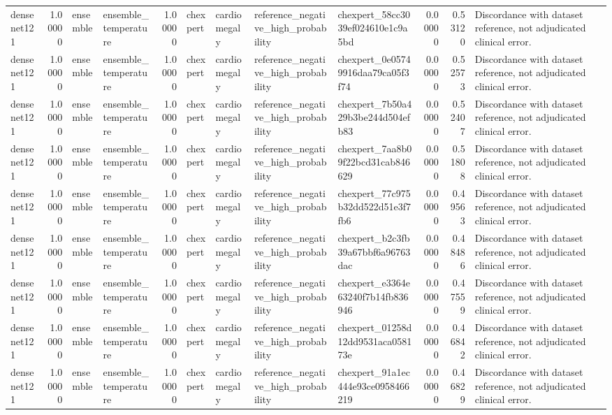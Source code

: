 \begin{tabular}{lrllrllllrrl}
densenet121 & 1.00000 & ensemble & ensemble\_temperature & 1.00000 & chexpert & cardiomegaly & reference\_negative\_high\_probability & chexpert\_58cc3039ef024610e1c9a5bd & 0.00000 & 0.53120 & Discordance with dataset reference, not adjudicated clinical error. \\
densenet121 & 1.00000 & ensemble & ensemble\_temperature & 1.00000 & chexpert & cardiomegaly & reference\_negative\_high\_probability & chexpert\_0e05749916daa79ca05f3f74 & 0.00000 & 0.52573 & Discordance with dataset reference, not adjudicated clinical error. \\
densenet121 & 1.00000 & ensemble & ensemble\_temperature & 1.00000 & chexpert & cardiomegaly & reference\_negative\_high\_probability & chexpert\_7b50a429b3be244d504efb83 & 0.00000 & 0.52407 & Discordance with dataset reference, not adjudicated clinical error. \\
densenet121 & 1.00000 & ensemble & ensemble\_temperature & 1.00000 & chexpert & cardiomegaly & reference\_negative\_high\_probability & chexpert\_7aa8b09f22bcd31cab846629 & 0.00000 & 0.51808 & Discordance with dataset reference, not adjudicated clinical error. \\
densenet121 & 1.00000 & ensemble & ensemble\_temperature & 1.00000 & chexpert & cardiomegaly & reference\_negative\_high\_probability & chexpert\_77c975b32dd522d51e3f7fb6 & 0.00000 & 0.49563 & Discordance with dataset reference, not adjudicated clinical error. \\
densenet121 & 1.00000 & ensemble & ensemble\_temperature & 1.00000 & chexpert & cardiomegaly & reference\_negative\_high\_probability & chexpert\_b2c3fb39a67bbf6a96763dac & 0.00000 & 0.48486 & Discordance with dataset reference, not adjudicated clinical error. \\
densenet121 & 1.00000 & ensemble & ensemble\_temperature & 1.00000 & chexpert & cardiomegaly & reference\_negative\_high\_probability & chexpert\_e3364e63240f7b14fb836946 & 0.00000 & 0.47559 & Discordance with dataset reference, not adjudicated clinical error. \\
densenet121 & 1.00000 & ensemble & ensemble\_temperature & 1.00000 & chexpert & cardiomegaly & reference\_negative\_high\_probability & chexpert\_01258d12dd9531aca058173e & 0.00000 & 0.46842 & Discordance with dataset reference, not adjudicated clinical error. \\
densenet121 & 1.00000 & ensemble & ensemble\_temperature & 1.00000 & chexpert & cardiomegaly & reference\_negative\_high\_probability & chexpert\_91a1ec444e93ce0958466219 & 0.00000 & 0.46829 & Discordance with dataset reference, not adjudicated clinical error. \\

\end{tabular}
